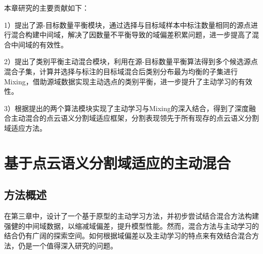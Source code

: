     本章研究的主要贡献如下：

    1）提出了源-目标数量平衡模块，通过选择与目标域样本中标注数量相同的源点进行混合构建中间域，解决了因数量不平衡导致的域偏差积累问题，进一步提高了混合中间域的有效性。

    2）提出了类别平衡主动混合模块，利用在源-目标数量平衡算法得到多个候选源点混合子集，计算并选择与标注的目标域混合后类别分布最为均衡的子集进行Mixing，借助源域数据实现主动选点的类别平衡，进一步提升了主动学习的有效性。

    3）根据提出的两个算法模块实现了主动学习与Mixing的深入结合，得到了深度融合主动混合的点云语义分割域适应框架，分割表现领先于所有现存的点云语义分割域适应方法。


    \section{基于点云语义分割域适应的主动混合}
    \subsection{方法概述}%
    在第三章中，设计了一个基于原型的主动学习方法，并初步尝试结合混合方法构建强健的中间域数据，以缩减域偏差，提升模型性能。然而，混合方法与主动学习的结合仍有广阔的探索空间。如何根据域偏差以及主动学习的特点来有效结合混合方法，仍是一个值得深入研究的问题。

